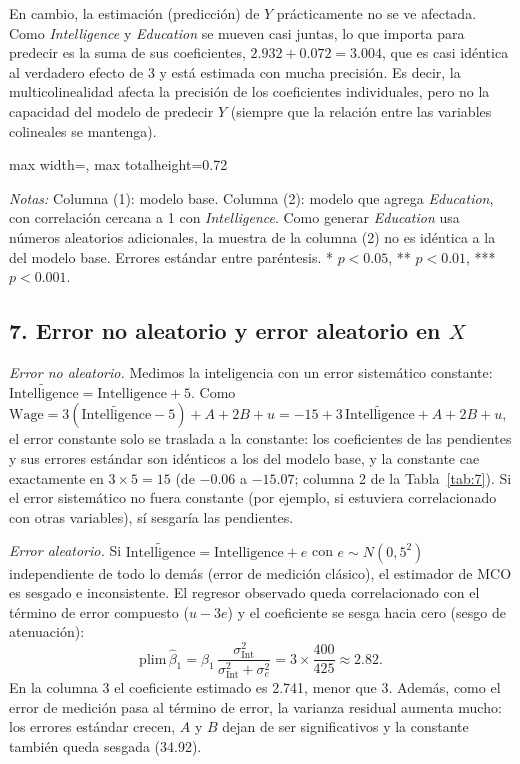 \documentclass[11pt,a4paper]{article}
\newcommand{\tabla}[1]{\begin{adjustbox}{max width=\linewidth, max totalheight=0.72\textheight}\end{adjustbox}}
\newcommand{\notas}[1]{\par\vspace{0.3em}\begin{minipage}{0.92\linewidth}\footnotesize\textit{Notas:} #1\end{minipage}}
\begin{document}
En cambio, la estimación (predicción) de $Y$ prácticamente no se ve afectada. Como \textit{Intelligence} y \textit{Education} se mueven casi juntas, lo que importa para predecir es la suma de sus coeficientes, $2.932+0.072=3.004$, que es casi idéntica al verdadero efecto de 3 y está estimada con mucha precisión. Es decir, la multicolinealidad afecta la precisión de los coeficientes individuales, pero no la capacidad del modelo de predecir $Y$ (siempre que la relación entre las variables colineales se mantenga).

\begin{table}[H]\centering
\caption{Alta multicolinealidad}\label{tab:6}
\tabla{"../output/Tabla 6.tex"}
\notas{Columna (1): modelo base. Columna (2): modelo que agrega \textit{Education}, con correlación cercana a 1 con \textit{Intelligence}. Como generar \textit{Education} usa números aleatorios adicionales, la muestra de la columna (2) no es idéntica a la del modelo base. Errores estándar entre paréntesis. * $p<0.05$, ** $p<0.01$, *** $p<0.001$.}
\end{table}

\subsection*{7. Error no aleatorio y error aleatorio en $X$}

\textit{Error no aleatorio.} Medimos la inteligencia con un error sistemático constante: $\widetilde{\text{Intelligence}}=\text{Intelligence}+5$. Como $\text{Wage}=3(\widetilde{\text{Intelligence}}-5)+A+2B+u=-15+3\,\widetilde{\text{Intelligence}}+A+2B+u$, el error constante solo se traslada a la constante: los coeficientes de las pendientes y sus errores estándar son idénticos a los del modelo base, y la constante cae exactamente en $3\times5=15$ (de $-0.06$ a $-15.07$; columna 2 de la Tabla~\ref{tab:7}). Si el error sistemático no fuera constante (por ejemplo, si estuviera correlacionado con otras variables), sí sesgaría las pendientes.

\textit{Error aleatorio.} Si $\widetilde{\text{Intelligence}}=\text{Intelligence}+e$ con $e\sim N(0,5^2)$ independiente de todo lo demás (error de medición clásico), el estimador de MCO es sesgado e inconsistente. El regresor observado queda correlacionado con el término de error compuesto ($u-3e$) y el coeficiente se sesga hacia cero (sesgo de atenuación):
\[
\text{plim}\,\hat\beta_1=\beta_1\,\frac{\sigma^2_{\text{Int}}}{\sigma^2_{\text{Int}}+\sigma^2_e}=3\times\frac{400}{425}\approx2.82.
\]
En la columna 3 el coeficiente estimado es 2.741, menor que 3. Además, como el error de medición pasa al término de error, la varianza residual aumenta mucho: los errores estándar crecen, $A$ y $B$ dejan de ser significativos y la constante también queda sesgada (34.92).
\end{document}
